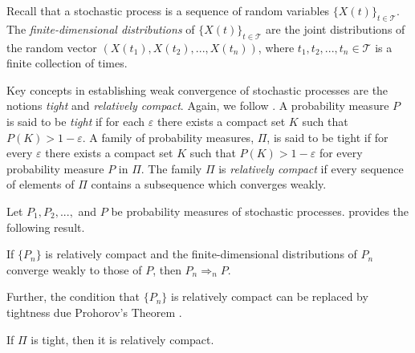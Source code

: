 Recall that a stochastic process is a sequence of random variables \(\{X(t)\}_{t\in\mathcal T}\). The \emph{finite-dimensional distributions} of \(\{X(t)\}_{t\in\mathcal T}\) are the joint distributions of the random vector \((X(t_1),X(t_2),...,X(t_n))\), where \(t_1,t_2,...,t_n\in \mathcal T\) is a finite collection of times. 

Key concepts in establishing weak convergence of stochastic processes are the notions \emph{tight} and \emph{relatively compact}. Again, we follow \cite{billingsleyconvergence}. A probability measure \(P\) is said to be \emph{tight} if for each \(\varepsilon\) there exists a compact set \(K\) such that \(P(K)>1-\varepsilon\). A family of probability measures, \(\Pi\), is said to be tight if for every \(\varepsilon\) there exists a compact set \(K\) such that \(P(K)>1-\varepsilon\) for every probability measure \(P\) in \(\Pi\). The family \(\Pi\) is \emph{relatively compact} if every sequence of elements of \(\Pi\) contains a subsequence which converges weakly. 

Let \(P_1,P_2,...,\) and \(P\) be probability measures of stochastic processes. \cite{billingsleyconvergence} provides the following result.
\begin{thm}\label{thm: aofaa}
	If \(\{P_n\}\) is relatively compact and the finite-dimensional distributions of \(P_n\) converge weakly to those of \(P\), then \(P_n\Rightarrow_n P\). 
\end{thm}
Further, the condition that \(\{P_n\}\) is relatively compact can be replaced by tightness due Prohorov's Theorem \citep{billingsleyconvergence}. 
\begin{thm}
	If \(\Pi\) is tight, then it is relatively compact.
\end{thm}


